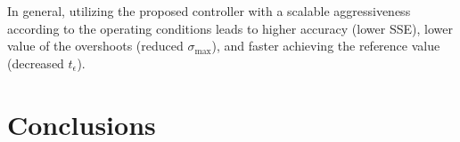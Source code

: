 \documentclass[preprint,12pt]{elsarticle}
\begin{document}



In general, utilizing the proposed controller with a scalable aggressiveness according to the operating conditions leads to higher accuracy (lower SSE), lower value of the overshoots (reduced $\sigma_{\mathrm{max}}$), and faster achieving the reference value (decreased $t_{\epsilon}$). %
	
	
	\section{Conclusions}
	\label{sec:conclusion}
	
\end{document}

